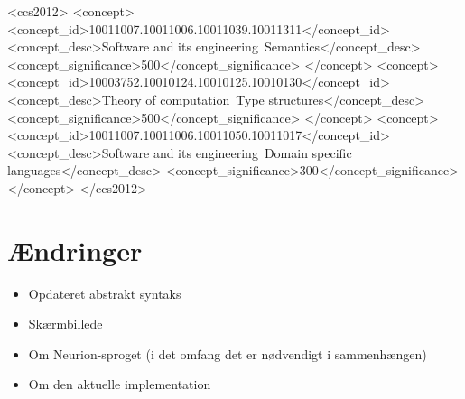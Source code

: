 \documentclass[sigplan,screen]{acmart}
\begin{document}
\begin{CCSXML}
<ccs2012>
<concept>
<concept_id>10011007.10011006.10011039.10011311</concept_id>
<concept_desc>Software and its engineering~Semantics</concept_desc>
<concept_significance>500</concept_significance>
</concept>
<concept>
<concept_id>10003752.10010124.10010125.10010130</concept_id>
<concept_desc>Theory of computation~Type structures</concept_desc>
<concept_significance>500</concept_significance>
</concept>
<concept>
<concept_id>10011007.10011006.10011050.10011017</concept_id>
<concept_desc>Software and its engineering~Domain specific languages</concept_desc>
<concept_significance>300</concept_significance>
</concept>
</ccs2012>
\end{CCSXML}


\maketitle              %

\thispagestyle{empty}

\section{Ændringer}

\begin{itemize}
\item Opdateret abstrakt syntaks  
\item Skærmbillede
\item Om Neurion-sproget (i det omfang det er nødvendigt i sammenhængen)
\item Om den aktuelle implementation
\end{itemize}








%
%
%



\end{document}
